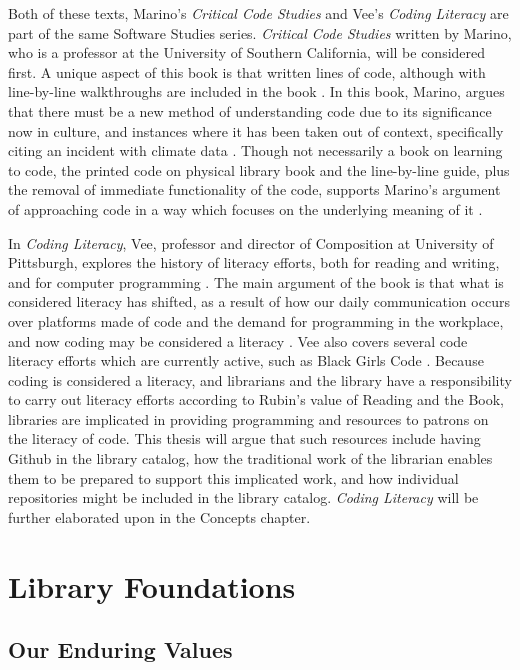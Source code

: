 Both of these texts, Marino's \textit{Critical Code Studies} and Vee's \textit{Coding Literacy} are part of the same Software Studies series. \textit{Critical Code Studies} written by Marino, who is a professor at the University of Southern California, will be considered first. A unique aspect of this book is that written lines of code, although with line-by-line walkthroughs are included in the book \cite{marino2020critical}. In this book, Marino, argues that there must be a new method of understanding code due to its significance now in culture, and instances where it has been taken out of context, specifically citing an incident with climate data \cite{marino2020critical}. Though not necessarily a book on learning to code, the printed code on physical library book and the line-by-line guide, plus the removal of immediate functionality of the code, supports Marino's argument of approaching code in a way which focuses on the underlying meaning of it \cite{marino2020critical}. 

In \textit{Coding Literacy}, Vee, professor and director of Composition at University of Pittsburgh, explores the history of literacy efforts, both for reading and writing, and for computer programming \cite{vee2017coding}. The main argument of the book is that what is considered literacy has shifted, as a result of how our daily communication occurs over platforms made of code and the demand for programming in the workplace, and now coding may be considered a literacy \cite{vee2017coding}. Vee also covers several code literacy efforts which are currently active, such as Black Girls Code \cite{vee2017coding}. Because coding is considered a literacy, and librarians and the library have a responsibility to carry out literacy efforts according to Rubin's value of Reading and the Book\cite{rubin2016foundationslis}, libraries are implicated in providing programming and resources to patrons on the literacy of code. This thesis will argue that such resources include having Github in the library catalog, how the traditional work of the librarian enables them to be prepared to support this implicated work, and how individual repositories might be included in the library catalog. \textit{Coding Literacy} will be further elaborated upon in the Concepts chapter. 

\section{Library Foundations}

\subsection{Our Enduring Values}

